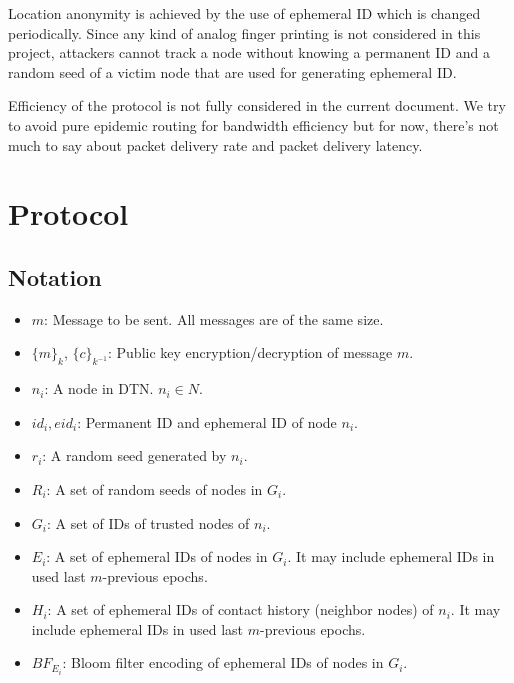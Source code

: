 \documentclass[11pt]{article}
\begin{document}
Location anonymity is achieved by the use of ephemeral ID which is changed periodically.  Since any kind of analog finger printing is not considered in this project, attackers cannot track a node without knowing a permanent ID and a random seed of a victim node that are used for generating ephemeral ID. 

Efficiency of the protocol is not fully considered in the current document. We try to avoid pure epidemic routing for bandwidth efficiency but for now, there's not much to say about packet delivery rate and packet delivery latency. 



\section{Protocol}

\subsection{Notation}
\begin{itemize}
\item $m$: Message to be sent. All messages are of the same size. 
\item $\{m\}_{k}$, $\{c\}_{k^{-1}}$: Public key encryption/decryption of message $m$.

\item $n_i$: A node in DTN. $n_i \in N$.
\item $id_i, eid_i$: Permanent ID and ephemeral ID of node $n_i$.
\item $r_i$: A random seed generated by $n_i$.
\item $R_i$: A set of random seeds of nodes in $G_i$.
\item $G_i$: A set of IDs of trusted nodes of $n_i$.
\item $E_i$: A set of ephemeral IDs of nodes in $G_i$. It may include ephemeral IDs in used last $m$-previous epochs. 
\item $H_i$: A set of ephemeral IDs of contact history (neighbor nodes) of $n_i$.  It may include ephemeral IDs in used last $m$-previous epochs. 
\item $BF_{E_i}$: Bloom filter encoding of ephemeral IDs of nodes in $G_i$.
\end{itemize}
\end{document}
